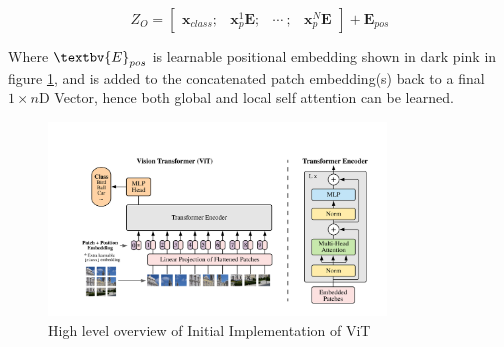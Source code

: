 \begin{equation}
    Z_O = \begin{bmatrix}
    \textbf{x}_{class};& \textbf{x}^1_p\textbf{E};& \dotsm \ ; & \textbf{x}_p^N\textbf{E} 
    \end{bmatrix} + \textbf{E}_{pos}
\end{equation}

Where $\textbv{E}_{pos}$ is learnable positional embedding shown in dark pink in figure \ref{fig:ViT}, and is added to the concatenated patch embedding(s) back to a final $1\times n$D Vector, hence both global and local self attention can be learned. 

\begin{figure}[h!]
    \centering
    \includegraphics[width=0.8\textwidth]{figures/research_methadology/Dosovitskiy2020_VIT.png}
    \caption{High level overview of Initial Implementation of ViT  \cite{Dosovitskiy2020}}
    \label{fig:ViT}
\end{figure}

\newpage

